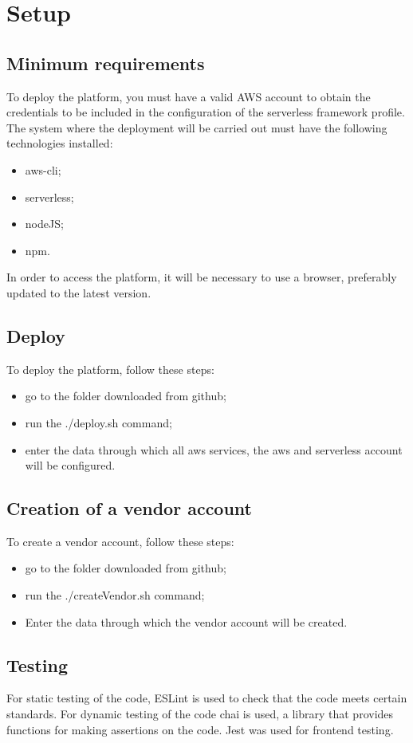 \section{Setup}
\subsection{Minimum requirements}
To deploy the platform, you must have a valid AWS account to obtain the credentials to be included in the configuration of the serverless framework profile.\newline
The system where the deployment will be carried out must have the following technologies installed:
\begin{itemize}
    \item aws-cli;
    \item serverless;
    \item nodeJS;
    \item npm.
\end{itemize}
In order to access the platform, it will be necessary to use a browser, preferably updated to the latest version.
\subsection{Deploy}
To deploy the platform, follow these steps:
\begin{itemize}
    \item go to the folder downloaded from github;
    \item run the ./deploy.sh command;
    \item enter the data through which all aws services, the aws and serverless account will be configured.
\end{itemize}
\subsection{Creation of a vendor account}
To create a vendor account, follow these steps:
\begin{itemize}
    \item go to the folder downloaded from github;
    \item run the ./createVendor.sh command;
    \item Enter the data through which the vendor account will be created.
\end{itemize}
\subsection{Testing}
For static testing of the code, ESLint is used to check that the code meets certain standards.\newline
For dynamic testing of the code chai is used, a library that provides functions for making assertions on the code.
Jest was used for frontend testing.
